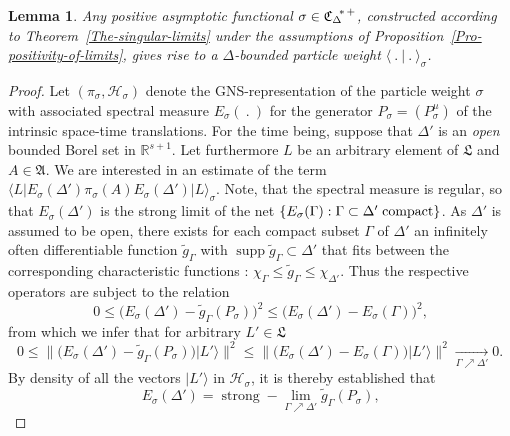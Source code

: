 \documentclass[11pt,twoside,openright]{report}
\theoremstyle{definition}
\theoremstyle{plain}
\newtheorem{Lem}[Def]{Lemma}
\theoremstyle{remark}
\theoremstyle{assumption}
\DeclareMathOperator{\supp}{supp}
\DeclareMathOperator{\str}{strong}
\newcommand{\set}[1]{\{ #1 \}}
\newcommand{\bnorm}[1]{\bigl\lVert #1 \bigr\rVert}
\newcommand{\ket}[1]{\vert #1 \rangle}
\newcommand{\scp}[2]{\langle #1 \vert #2 \rangle}
\newcommand{\scpx}[3]{\langle #1 \vert #2 \vert #3 \rangle}
\newcommand{\Afrak}{\mathfrak{A}}
\newcommand{\Lfrak}{\mathfrak{L}}
\newcommand{\Hscr}{\mathscr{H}}
\newcommand{\Rsone}{\mathbb{R}^{s + 1}}
\newcommand{\EsDprime}{E_\sigma ( \Delta' )}
\newcommand{\EsGamma}{E_\sigma ( \Gamma )}
\newcommand{\CDstarplus}{{\mathfrak{C}_\Delta}^{\negthickspace *
    \thinspace +}}
\begin{document}
\begin{Lem}
  \label{Lem-Delta-bound}
  Any positive asymptotic functional $\sigma \in \CDstarplus$,
  constructed according to Theorem~\ref{The-singular-limits} under the
  assumptions of Proposition~\ref{Pro-positivity-of-limits}, gives
  rise to a $\Delta$-bounded particle weight $\scp{~.~}{~.~}_\sigma$.
\end{Lem}
\begin{proof}
  Let $( \pi_\sigma , \Hscr_\sigma )$ denote the GNS-representation of
  the particle weight $\sigma$ with associated spectral measure
  $E_\sigma (~.~)$ for the generator $P_\sigma = ( P_\sigma^\mu )$ of
  the intrinsic space-time translations. For the time being, suppose
  that $\Delta'$ is an \emph{open} bounded Borel set in $\Rsone$. Let
  furthermore $L$ be an arbitrary element of $\Lfrak$ and $A \in
  \Afrak$. We are interested in an estimate of the term
  $\scpx{L}{\EsDprime \pi_\sigma ( A ) \EsDprime}{L}_\sigma$. Note,
  that the spectral measure is regular, so that $\EsDprime$ is the
  strong limit of the net $\set{\EsGamma : \Gamma \subset \Delta'
  \thickspace \text{compact}}$. As $\Delta'$ is assumed to be open,
  there exists for each compact subset $\Gamma$ of $\Delta'$ an
  infinitely often differentiable function $\tilde{g}_\Gamma$ with
  $\supp \tilde{g}_\Gamma \subset \Delta'$ that fits between the
  corresponding characteristic functions
  \cite[Satz~7.7]{jantscher:1971}: $\chi_\Gamma \leqslant
  \tilde{g}_\Gamma \leqslant \chi_{\Delta'}$. Thus the respective
  operators are subject to the relation
  \begin{equation*}
    0 \leqslant \bigl( \EsDprime - \tilde{g}_\Gamma ( P_\sigma )
    \bigr)^2 \leqslant \bigl( \EsDprime - \EsGamma \bigr)^2 \text{,}
  \end{equation*}
  from which we infer that for arbitrary $L' \in \Lfrak$
  \begin{equation}
    \label{eq-regular-Esigma-approx}
    0 \leqslant \bnorm{\bigl( \EsDprime - \tilde{g}_\Gamma ( P_\sigma
    ) \bigr) \ket{L'}}^2 \leqslant \bnorm{\bigl( \EsDprime - \EsGamma
    \bigr) \ket{L'}}^2 \xrightarrow[\Gamma \nearrow \Delta']{} 0
    \text{.}
  \end{equation}
  By density of all the vectors $\ket{L'}$ in $\Hscr_\sigma$, it is
  thereby established that
  \begin{equation}
    \label{eq-regular-Esigma-strong-approx}
    \EsDprime = \str-\lim_{\Gamma \nearrow \Delta'} \tilde{g}_\Gamma (
    P_\sigma ) \text{,}
  \end{equation}

\end{proof}
\end{document}
